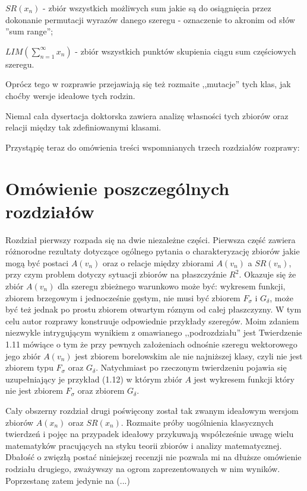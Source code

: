 \documentclass[12pt]{article}
\begin{document}
$SR(x_n)$ - zbiór wszystkich możliwych sum jakie są
do osiągnięcia przez dokonanie permutacji wyrazów
danego szeregu - oznaczenie to akronim od słów 
''sum range'';

$LIM(\sum_{n=1}^\infty x_n)$ - zbiór wszystkich punktów
skupienia ciągu sum częściowych szeregu.

  Oprócz tego w rozprawie przejawiają się też rozmaite ,,mutacje''
tych klas, jak choćby wersje ideałowe tych rodzin.
  
  Niemal cała dysertacja doktorska zawiera analizę
własności tych zbiorów oraz relacji między tak zdefiniowanymi
klasami.
  

  Przystąpię teraz do omówienia treści wspomnianych trzech rozdziałów rozprawy:

\section{Omówienie poszczególnych rozdziałów}

Rozdział pierwszy rozpada się na dwie niezależne części.
Pierwsza część zawiera różnorodne rezultaty dotyczące ogólnego
pytania o charakteryzację zbiorów jakie mogą być postaci $A(v_n)$
oraz o relacje między zbiorami $A(v_n)$ a $SR(v_n)$, przy czym
problem dotyczy sytuacji zbiorów na płaszczyźnie $R^2$.
Okazuje się że zbiór $A(v_n)$ dla szeregu zbieżnego warunkowo 
może być: wykresem funkcji,
zbiorem brzegowym i jednocześnie gęstym, nie musi być zbiorem
$F_\sigma$ i $G_\delta$, może być też jednak po prostu zbiorem
otwartym róznym od całej płaszczyzny. W tym celu autor rozprawy 
konstruuje odpowiednie przykłady szeregów. Moim zdaniem niezwykle
intrygującym wynikiem z omawianego ,,podrozdziału'' jest Twierdzenie
1.11 mówiące o tym że przy pewnych założeniach odnośnie szeregu
wektorowego jego zbiór $A(v_n)$ jest zbiorem borelowskim ale
nie najniższej klasy, czyli nie jest zbiorem typu $F_\sigma$ oraz
$G_\delta$. Natychmiast po rzeczonym twierdzeniu pojawia się uzupełniający
je przykład (1.12) w którym zbiór $A$ jest wykresem funkcji 
który nie jest zbiorem $F_\sigma$ oraz zbiorem $G_\delta$. 
    
  Cały obszerny rozdział drugi poświęcony został 
tak zwanym ideałowym wersjom zbiorów $A(x_n)$ oraz
$SR(x_n)$. Rozmaite próby uogólnienia klasycznych twierdzeń
i pojęc na przypadek ideałowy przykuwają współcześnie
uwagę wielu matematyków pracujących na styku teorii zbiorów 
i analizy matematycznej. Dbałość o zwięzłą postać niniejszej
recenzji nie pozwala mi na dłuższe omówienie rodziału drugiego,
zważywszy na ogrom zaprezentowanych w nim wyników. Poprzestanę zatem
jedynie na (...)
  
\end{document}
